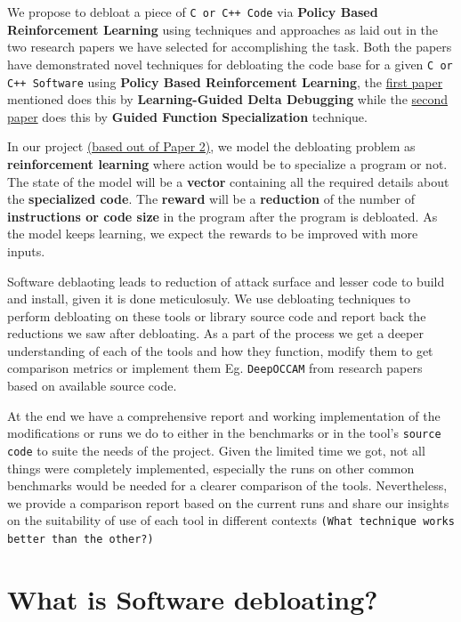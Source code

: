 \documentclass{relatorio}
\begin{document}
We propose to debloat a piece of \texttt{C or C++ Code} via \textbf{Policy Based Reinforcement Learning} using techniques and approaches as laid out in the two research papers we have selected for accomplishing the task. Both the papers have demonstrated novel techniques for debloating the code base for a given \texttt{C or C++ Software} using \textbf{Policy Based Reinforcement Learning}, the \href{https://dl.acm.org/doi/10.1145/3243734.3243838}{first paper} mentioned does this by \textbf{Learning-Guided Delta Debugging}  while the \href{http://www.csl.sri.com/users/gehani/papers/MLSys-2019.DeepOCCAM.pdf}{second paper} does this by \textbf{Guided Function Specialization} technique. 

In our project \href{http://www.csl.sri.com/users/gehani/papers/MLSys-2019.DeepOCCAM.pdf}{(based out of Paper 2)}, we model the debloating problem as \textbf{reinforcement learning} where action would be to specialize a program or not. The state of the model will be a \textbf{vector} containing all the required details about the \textbf{specialized code}. The \textbf{reward} will be a \textbf{reduction} of the number of \textbf{instructions or code size} in the program after the program is debloated. As the model keeps learning, we expect the rewards to be improved with more inputs. 

Software deblaoting leads to reduction of attack surface and lesser code to build and install, given it is done meticulosuly. We use debloating 
techniques to perform debloating on these tools or library source code and report back the reductions we saw after debloating. As a part of the process
we get a deeper understanding of each of the tools and  how they function, modify them to get comparison metrics or implement them Eg. \texttt{DeepOCCAM} 
from research papers based on available source code. 

At the end we have a comprehensive report and working implementation of the modifications or runs we do to either in the benchmarks or in the tool's 
\texttt{source code} to suite the needs of the project. Given the limited time we got, not all things were completely implemented, especially the runs on other common
benchmarks would be needed for a clearer comparison of the tools. Nevertheless, we provide a comparison report based on the current runs and share our insights on the suitability
of use of each tool in different contexts \texttt{(What technique works better than the other?)} 

\section{What is Software debloating?}%
\end{document}
